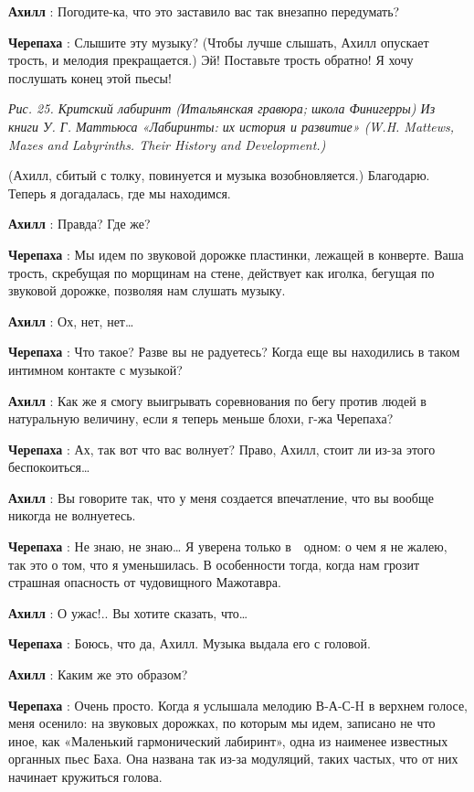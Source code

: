 \textbf{Ахилл} : Погодите-ка, что это заставило вас так внезапно передумать?

\textbf{Черепаха} : Слышите эту музыку? (Чтобы лучше слышать, Ахилл опускает трость, и мелодия прекращается.) Эй! Поставьте трость обратно! Я хочу послушать конец этой пьесы!

\emph{Рис. 25. Критский лабиринт (Итальянская гравюра; школа Финигерры) Из книги У. Г. Маттьюса «Лабиринты: их история и развитие» (W.H. Mattews, Mazes and Labyrinths. Their History and Development.)}

(Ахилл, сбитый с толку, повинуется и музыка возобновляется.) Благодарю. Теперь я догадалась, где мы находимся.

\textbf{Ахилл} : Правда? Где же?

\textbf{Черепаха} : Мы идем по звуковой дорожке пластинки, лежащей в конверте. Ваша трость, скребущая по морщинам на стене, действует как иголка, бегущая по звуковой дорожке, позволяя нам слушать музыку.

\textbf{Ахилл} : Ох, нет, нет\ldots{}

\textbf{Черепаха} : Что такое? Разве вы не радуетесь? Когда еще вы находились в таком интимном контакте с музыкой?

\textbf{Ахилл} : Как же я смогу выигрывать соревнования по бегу против людей в натуральную величину, если я теперь меньше блохи, г-жа Черепаха?

\textbf{Черепаха} : Ах, так вот что вас волнует? Право, Ахилл, стоит ли из-за этого беспокоиться\ldots{}

\textbf{Ахилл} : Вы говорите так, что у меня создается впечатление, что вы вообще никогда не волнуетесь.

\textbf{Черепаха} : Не знаю, не знаю\ldots{} Я уверена только в~~одном: о чем я не жалею, так это о том, что я уменьшилась. В особенности тогда, когда нам грозит страшная опасность от чудовищного Мажотавра.

\textbf{Ахилл} : О ужас!.. Вы хотите сказать, что\ldots{}

\textbf{Черепаха} : Боюсь, что да, Ахилл. Музыка выдала его с головой.

\textbf{Ахилл} : Каким же это образом?

\textbf{Черепаха} : Очень просто. Когда я услышала мелодию В-А-С-H в верхнем голосе, меня осенило: на звуковых дорожках, по которым мы идем, записано не что иное, как «Маленький гармонический лабиринт», одна из наименее известных органных пьес Баха. Она названа так из-за модуляций, таких частых, что от них начинает кружиться голова.

